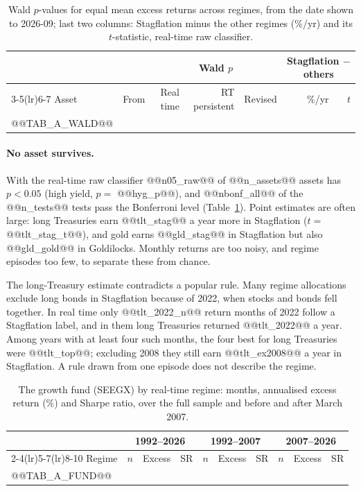 \documentclass[11pt,a4paper]{article}
\begin{document}
\begin{table}[htbp]
\centering
\caption{Wald $p$-values for equal mean excess returns across regimes, from the date shown to 2026-09; last two
columns: Stagflation minus the other regimes (\%/yr) and its $t$-statistic, real-time raw classifier.}
\label{tab:wald}
\footnotesize
\setlength{\tabcolsep}{4pt}
\begin{tabular}{@{}lrrrrrr@{}}
\toprule
& & \multicolumn{3}{c}{Wald $p$} & \multicolumn{2}{c}{Stagflation $-$ others} \\
\cmidrule(lr){3-5}\cmidrule(lr){6-7}
Asset & From & Real time & RT persistent & Revised & \%/yr & $t$ \\
\midrule
@@TAB_A_WALD@@
\bottomrule
\end{tabular}
\end{table}

\paragraph{No asset survives.} With the real-time raw classifier @@n05_raw@@ of @@n_assets@@ assets has $p<0.05$
(high yield, $p=$ @@hyg_p@@), and @@nbonf_all@@ of the @@n_tests@@ tests pass the Bonferroni level
(Table~\ref{tab:wald}). Point estimates are often large: long Treasuries earn @@tlt_stag@@ a year more in
Stagflation ($t=$ @@tlt_stag_t@@), and gold earns @@gld_stag@@ in Stagflation but also @@gld_gold@@ in
Goldilocks. Monthly returns are too noisy, and regime episodes too few, to separate these from chance.

The long-Treasury estimate contradicts a popular rule. Many regime allocations exclude long bonds in
Stagflation because of 2022, when stocks and bonds fell together. In real time only @@tlt_2022_n@@ return months
of 2022 follow a Stagflation label, and in them long Treasuries returned @@tlt_2022@@ a year. Among years with
at least four such months, the four best for long Treasuries were @@tlt_top@@; excluding 2008 they still earn
@@tlt_ex2008@@ a year in Stagflation. A rule drawn from one episode does not describe the regime.

\begin{table}[htbp]
\centering
\caption{The growth fund (SEEGX) by real-time regime: months, annualised excess return (\%) and Sharpe ratio,
over the full sample and before and after March 2007.}
\label{tab:fund}
\footnotesize
\setlength{\tabcolsep}{3.5pt}
\begin{tabular}{@{}lrrrrrrrrr@{}}
\toprule
& \multicolumn{3}{c}{1992--2026} & \multicolumn{3}{c}{1992--2007} & \multicolumn{3}{c}{2007--2026} \\
\cmidrule(lr){2-4}\cmidrule(lr){5-7}\cmidrule(lr){8-10}
Regime & $n$ & Excess & SR & $n$ & Excess & SR & $n$ & Excess & SR \\
\midrule
@@TAB_A_FUND@@
\bottomrule
\end{tabular}
\end{table}
\end{document}
